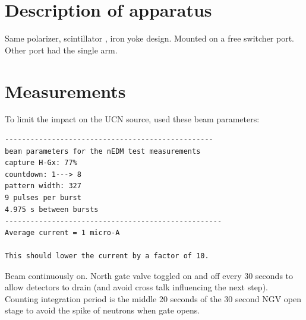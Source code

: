 
\section{Description of apparatus}


Same polarizer, \BZnS scintillator , iron yoke design. Mounted on a free switcher port. Other port had the single arm. 


\section{Measurements}


To limit the impact on the UCN source, used these beam parameters: 

\begin{small}
\begin{verbatim}
-------------------------------------------------
beam parameters for the nEDM test measurements
capture H-Gx: 77%
countdown: 1---> 8
pattern width: 327
9 pulses per burst
4.975 s between bursts
---------------------------------------------------
Average current = 1 micro-A

This should lower the current by a factor of 10.

\end{verbatim}
\end{small}

Beam continuously on. North gate valve toggled on and off every 30 seconds to allow detectors to drain (and avoid cross talk influencing the next step). Counting integration period is the middle 20 seconds of the 30 second NGV open stage to avoid the spike of neutrons when gate opens.



